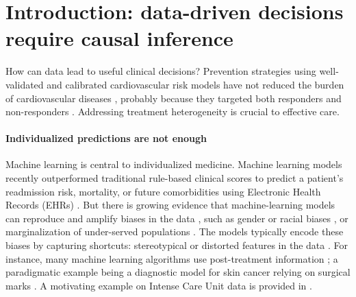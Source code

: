 \documentclass[10pt,letterpaper]{article}
\begin{document}
\linenumbers

\section*{Introduction: data-driven decisions require causal inference}


How can data lead to useful clinical decisions? Prevention strategies using
well-validated and calibrated cardiovascular risk models have not reduced the
burden of cardiovascular diseases \cite{eriksen2021effectiveness}, probably because they targeted both
responders and non-responders  \cite{krska2016implementation}. Addressing treatment heterogeneity is crucial to
effective care.

\paragraph{Individualized predictions are not enough}
Machine learning is central to individualized medicine. Machine learning models
recently outperformed traditional rule-based clinical scores to predict a
patient's readmission risk, mortality, or future comorbidities using Electronic
Health Records (EHRs) \cite{rajkomar2018scalable,
    liu2019comparison,li2020behrt,beaulieu2021machine, aggarwal2021diagnostic}.
%
But there is growing evidence that machine-learning models can reproduce and
amplify biases in the data \cite{rajkomar2018ensuring}, such as gender or
racial biases \cite{singh2022generalizability,gichoya2022ai}, or marginalization of
under-served populations \cite{seyyed2021underdiagnosis}. The models
typically encode these biases by capturing shortcuts: stereotypical or
distorted features in the data \cite{geirhos2020shortcut,winkler2019association,degrave2021ai}.
%
For instance, many machine learning algorithms use post-treatment information
\cite{badgeley2019deep,obermeyer2019dissecting,yuan2021temporal,wong2021external};
a paradigmatic example being a diagnostic model for skin cancer relying on
surgical marks \cite{winkler2019association}. A motivating example on Intense Care
Unit data is provided in .
\end{document}
